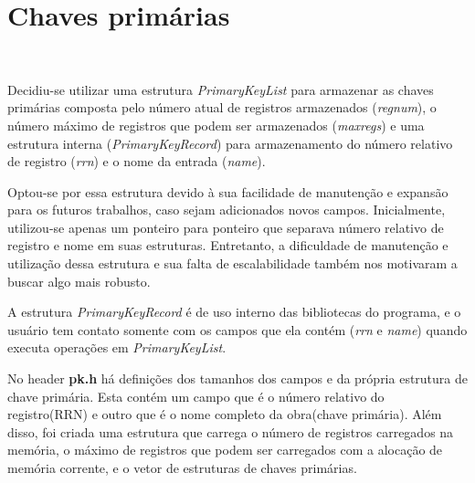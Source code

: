 \documentclass{article}
\begin{document}

\section{Chaves primárias}\

Decidiu-se utilizar uma estrutura \textit{PrimaryKeyList} para armazenar as chaves primárias composta pelo número atual de registros armazenados (\textit{regnum}), o número máximo de registros que podem ser armazenados (\textit{maxregs}) e uma estrutura interna (\textit{PrimaryKeyRecord}) para armazenamento do número relativo de registro (\textit{rrn}) e o nome da entrada (\textit{name}).

Optou-se por essa estrutura devido à sua facilidade de manutenção e expansão para os futuros trabalhos, caso sejam adicionados novos campos. Inicialmente, utilizou-se apenas um ponteiro para ponteiro que separava número relativo de registro e nome em suas estruturas. Entretanto, a dificuldade de manutenção e utilização dessa estrutura e sua falta de escalabilidade também nos motivaram a buscar algo mais robusto.

A estrutura \textit{PrimaryKeyRecord} é de uso interno das bibliotecas do programa, e o usuário tem contato somente com os campos que ela contém (\textit{rrn} e \textit{name}) quando executa operações em \textit{PrimaryKeyList}.

No header \textbf{pk.h} há definições dos tamanhos dos campos e da própria estrutura de chave primária. Esta contém um campo que é o número relativo do registro(RRN) e outro que é o nome completo da obra(chave primária). Além disso, foi criada uma estrutura que carrega o número de registros carregados na memória, o máximo de registros que podem ser carregados com a alocação de memória corrente, e o vetor de estruturas de chaves primárias. 
\end{document}

